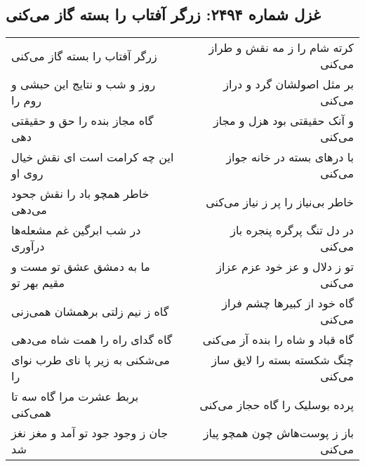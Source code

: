 \begin{center}
\section*{غزل شماره ۲۴۹۴: زرگر آفتاب را بسته گاز می‌کنی}
\label{sec:2494}
\begin{longtable}{l p{0.5cm} r}
زرگر آفتاب را بسته گاز می‌کنی
&&
کرته شام را ز مه نقش و طراز می‌کنی
\\
روز و شب و نتایج این حبشی و روم را
&&
بر مثل اصولشان گرد و دراز می‌کنی
\\
گاه مجاز بنده را حق و حقیقتی دهی
&&
و آنک حقیقتی بود هزل و مجاز می‌کنی
\\
این چه کرامت است ای نقش خیال روی او
&&
با درهای بسته در خانه جواز می‌کنی
\\
خاطر همچو باد را نقش جحود می‌دهی
&&
خاطر بی‌نیاز را پر ز نیاز می‌کنی
\\
در شب ابرگین غم مشعله‌ها درآوری
&&
در دل تنگ پرگره پنجره باز می‌کنی
\\
ما به دمشق عشق تو مست و مقیم بهر تو
&&
تو ز دلال و عز خود عزم عزاز می‌کنی
\\
گاه ز نیم زلتی برهمشان همی‌زنی
&&
گاه خود از کبیرها چشم فراز می‌کنی
\\
گاه گدای راه را همت شاه می‌دهی
&&
گاه قباد و شاه را بنده آز می‌کنی
\\
می‌شکنی به زیر پا نای طرب نوای را
&&
چنگ شکسته بسته را لایق ساز می‌کنی
\\
بربط عشرت مرا گاه سه تا همی‌کنی
&&
پرده بوسلیک را گاه حجاز می‌کنی
\\
جان ز وجود جود تو آمد و مغز نغز شد
&&
باز ز پوست‌هاش چون همچو پیاز می‌کنی
\\
\end{longtable}
\end{center}
